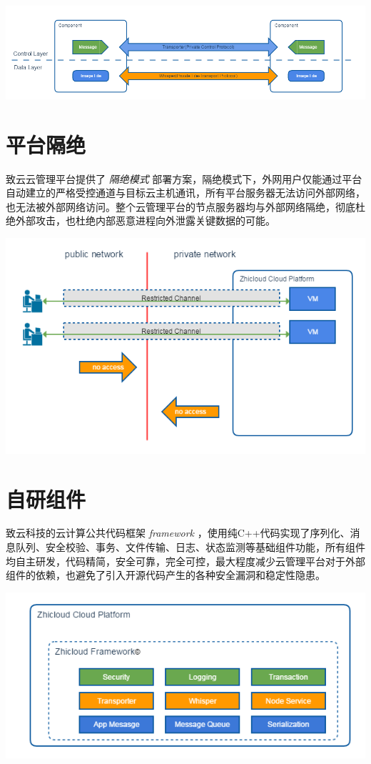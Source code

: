 \documentclass[letterpaper,10pt]{sphinxmanual}
\begin{document}
\includegraphics{5_3_private_protocol.png}


\section{平台隔绝}
\label{index:id26}
致云云管理平台提供了 \emph{隔绝模式} 部署方案，隔绝模式下，外网用户仅能通过平台自动建立的严格受控通道与目标云主机通讯，所有平台服务器无法访问外部网络，也无法被外部网络访问。整个云管理平台的节点服务器均与外部网络隔绝，彻底杜绝外部攻击，也杜绝内部恶意进程向外泄露关键数据的可能。

\includegraphics{5_4_platform_isolation.png}


\section{自研组件}
\label{index:id27}
致云科技的云计算公共代码框架 \emph{framework} ，使用纯C++代码实现了序列化、消息队列、安全校验、事务、文件传输、日志、状态监测等基础组件功能，所有组件均自主研发，代码精简，安全可靠，完全可控，最大程度减少云管理平台对于外部组件的依赖，也避免了引入开源代码产生的各种安全漏洞和稳定性隐患。

\includegraphics{5_5_integrated_framework.png}



\renewcommand{\indexname}{索引}
\printindex
\end{document}
